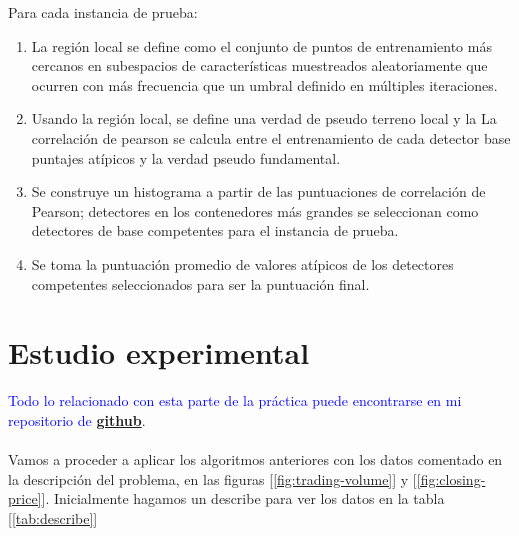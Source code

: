 \documentclass[12pt,twoside]{report}
\begin{document}
\begin{enumerate}
\begin{enumerate}
    Para cada instancia de prueba:
    	\begin{enumerate}
       \item La región local se define como el conjunto de puntos de entrenamiento más cercanos en
    subespacios de características muestreados aleatoriamente que ocurren con más frecuencia que
    un umbral definido en múltiples iteraciones.

    \item Usando la región local, se define una verdad de pseudo terreno local y la
    La correlación de pearson se calcula entre el entrenamiento de cada detector base
    puntajes atípicos y la verdad pseudo fundamental.

\item Se construye un histograma a partir de las puntuaciones de correlación de Pearson; detectores en
    los contenedores más grandes se seleccionan como detectores de base competentes para el
    instancia de prueba.

    \item Se toma la puntuación promedio de valores atípicos de los detectores competentes seleccionados
    para ser la puntuación final.
    	\end{enumerate}
	\end{enumerate}
\end{enumerate}


\chapter*{Estudio experimental}

\textcolor{blue}{Todo lo relacionado con esta parte de la práctica puede encontrarse en mi repositorio de \textbf{\href{https://github.com/daviduster/anomaly-detection-stock}{github}}}.\\
\\

Vamos a proceder a aplicar los algoritmos anteriores con los datos comentado en la descripción del problema, en las figuras [\ref{fig:trading-volume}] y [\ref{fig:closing-price}]. Inicialmente hagamos un describe para ver los datos en la tabla [\ref{tab:describe}]
\end{document}
